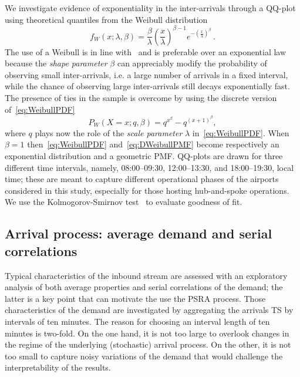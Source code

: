 \documentclass[]{elsarticle}
\makeatletter
\newcommand*{\ie}{i.e.\@\xspace}
\makeatother
\begin{document}
We investigate evidence of exponentiality in the inter-arrivals through a QQ-plot using theoretical quantiles from the Weibull distribution
\begin{equation}
    f_W(x; \lambda, \beta) = \frac{\beta}{\lambda} \left(\frac{x}{\lambda}\right)^{\beta-1} e^{-(\frac{x}{\lambda})^\beta} \,.
    \label{eq:WeibullPDF}
\end{equation}
The use of a Weibull is in line with~\citet{willemain2004statistical} and is preferable over an exponential law because the \emph{shape parameter} \(\beta\) can appreciably modify the probability of observing small inter-arrivals, \ie{} a large number of arrivals in a fixed interval, while the chance of observing large inter-arrivals still decays exponentially fast.
The presence of ties in the sample is overcome by using the discrete version of~\eqref{eq:WeibullPDF}~\citep{nakagawa1975discrete,barbiero2013discrete}
\begin{equation}
    P_W(X=x;q,\beta) = q^{x^\beta} - q^{(x+1)^\beta},
    \label{eq:DWeibullPMF}
\end{equation}
where \(q\) plays now the role of the \emph{scale parameter} \(\lambda\) in~\eqref{eq:WeibullPDF}.
When \(\beta = 1\) then~\eqref{eq:WeibullPDF} and~\eqref{eq:DWeibullPMF} become respectively an exponential distribution and a geometric \ac{PMF}.
QQ-plots are drawn for three different time intervals, namely, 08:00--09:30, 12:00--13:30, and 18:00--19:30, local time; these are meant to capture different operational phases of the airports considered in this study, especially for those hosting hub-and-spoke operations.
We use the Kolmogorov-Smirnov test~\citep{taylor2011nonparam} to evaluate goodness of fit.

\subsection{Arrival process: average demand and serial correlations}\label{sec:dm_serial_corr}

Typical characteristics of the inbound stream are assessed with an exploratory analysis of both average properties and serial correlations of the demand; the latter is a key point that can motivate the use the \ac{PSRA} process.
Those characteristics of the demand are investigated by aggregating the arrivals \ac{TS} by intervals of ten minutes.
The reason for choosing an interval length of ten minutes is two-fold.
On the one hand, it is not too large to overlook changes in the regime of the underlying (stochastic) arrival process.
On the other, it is not too small to capture noisy variations of the demand that would challenge the interpretability of the results.
\end{document}
